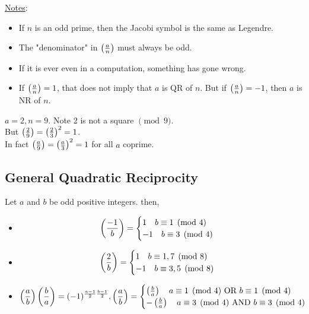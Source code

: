     \underline{Notes}: 
        \begin{itemize}
            \item If $n$ is an odd prime, then the Jacobi symbol is the same 
            as Legendre.
            \item The "denominator" in $\left( \frac{a}{n} \right) $ must always be odd. 
            \item If it is ever even in a computation, something has gone wrong.
            \item If $\left( \frac{a}{n} \right)  = 1$, that does not imply that $a$ is QR of $n$. 
                  But if $\left( \frac{a}{n} \right)  = -1$, then $a$ is NR of $n$. \\
        \end{itemize}
    
    \begin{example}
        $a=2,n=9$. Note 2 is not a square $\pmod{9}$. \\
        But $\left( \frac{2}{9} \right)  = \left( \frac{2}{3} \right) ^2 = 1$. \\
        In fact $\left( \frac{a}{9} \right)  = \left( \frac{a}{3} \right) ^2 = 1$
        for all $a$ coprime. \\
    \end{example}

    \subsection{General Quadratic Reciprocity}
    \begin{theorem} 
        Let $a$ and $b$ be odd positive integers. then, 
        \begin{itemize}
            \item 
            \[
                \left( \frac{-1}{b} \right)  = 
                \begin{cases}
                    1 \quad b\equiv 1\pmod{4} \\
                    -1 \quad b\equiv 3\pmod{4}
                \end{cases}
            \]
            \item 
            \[
                \left( \frac{2}{b} \right)  = 
                \begin{cases}
                    1 \quad b\equiv 1,7\pmod{8} \\
                    -1 \quad b\equiv 3,5\pmod{8}
                \end{cases}
            \]
            \item 
            \[
                \left( \frac{a}{b} \right) \left( \frac{b}{a} \right)  = (-1)^{\frac{a-1}{2}\frac{b-1}{2}}, \left( \frac{a}{b} \right)  =  
                \begin{cases}
                    \left( \frac{b}{a} \right)  \quad a\equiv 1\pmod{4} \text{ OR } b\equiv 1\pmod{4} \\
                    -\left( \frac{b}{a} \right)  \quad a\equiv 3\pmod{4} \text{ AND } b\equiv 3\pmod{4} \\
                \end{cases}
            \]
        \end{itemize}
    \end{theorem}

